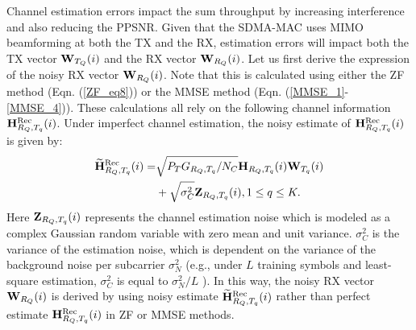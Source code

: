 \documentclass[journal, final]{IEEEtran}
\begin{document}
Channel estimation errors impact the sum throughput by increasing interference and also reducing the PPSNR. Given that the SDMA-MAC uses MIMO beamforming at both the TX and the RX, estimation errors will impact both the TX vector ${\rm {\bf W}}_{T_Q } (i)$
and the RX vector ${\rm {\bf W}}_{R_Q } (i)$. Let us first derive the expression of the noisy RX vector ${\rm {\bf
W}}_{R_Q } (i)$. Note that this is calculated using either the ZF method
(Eqn. (\ref{ZF_eq8})) or the MMSE method (Eqn. (\ref{MMSE_1}-\ref{MMSE_4})). These calculations all rely
on the following channel information ${\rm {\bf H}}_{R_Q ,T_q }^{{\rm Rec}}
(i)$. Under imperfect channel estimation, the noisy estimate of ${\rm {\bf
H}}_{R_Q ,T_q }^{{\rm Rec}} (i)$ is given by:
\begin{align}
\label{eq14}
\widetilde{{\rm {\bf H}}}_{R_Q ,T_q }^{{\rm Rec}} (i) =& \sqrt {P_T G_{R_Q
,T_q } / N_C } {\rm {\bf H}}_{R_Q ,T_q } (i){\rm {\bf W}}_{T_q } (i)\nonumber\\
&+ \sqrt{\sigma _C^2 } {\rm {\bf Z}}_{R_Q ,T_q } (i), 1 \le q \le K.
\end{align}
Here ${\rm {\bf Z}}_{R_Q ,T_q } (i)$ represents the channel estimation noise
which is modeled as a complex Gaussian random variable with zero mean and
unit variance. $\sigma _C^2 $ is the variance of the estimation noise, which
is dependent on the variance of the background noise per subcarrier $\sigma
_N^2 $ (e.g., under $L$ training symbols and least-square estimation,
$\sigma _C^2 $ is equal to $\sigma _N^2 / L$ \cite{3_NULLHOC}). In this way, the noisy RX
vector ${\rm {\bf W}}_{R_Q } (i)$ is derived by using noisy estimate
$\widetilde{{\rm {\bf H}}}_{R_Q ,T_q }^{{\rm Rec}} (i)$ rather than perfect
estimate ${\rm {\bf H}}_{R_Q ,T_q }^{{\rm Rec}} (i)$ in ZF or MMSE methods.
\end{document}
